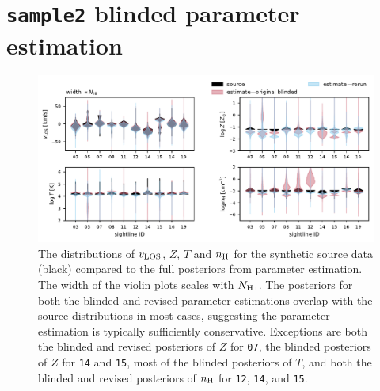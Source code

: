 \documentclass[fleqn,usenatbib]{mnras}
\begin{document}
\section{\texttt{sample2} blinded parameter estimation}
\label{a: sample2 blinded}

\begin{figure}
    \centering
    \includegraphics[width=\textwidth]{figures/sample2/violin.pdf}
    \caption{
    The distributions of $v_{\rm LOS}$, $Z$, $T$ and $n_{\rm H}$ for the synthetic source data (black) compared to the full posteriors from parameter estimation.
    The width of the violin plots scales with $N_{\ion{H}{I}}$.
    The posteriors for both the blinded and revised parameter estimations overlap with the source distributions in most cases, suggesting the parameter estimation is typically sufficiently conservative.
    Exceptions are
    both the blinded and revised posteriors of $Z$ for \texttt{07},
    the blinded posteriors of $Z$ for \texttt{14} and \texttt{15},
    most of the blinded posteriors of $T$,
    and both the blinded and revised posteriors of $n_{\rm H}$ for \texttt{12}, \texttt{14}, and \texttt{15}.
    }
    \label{f: sample2 violin both}
\end{figure}
\end{document}
